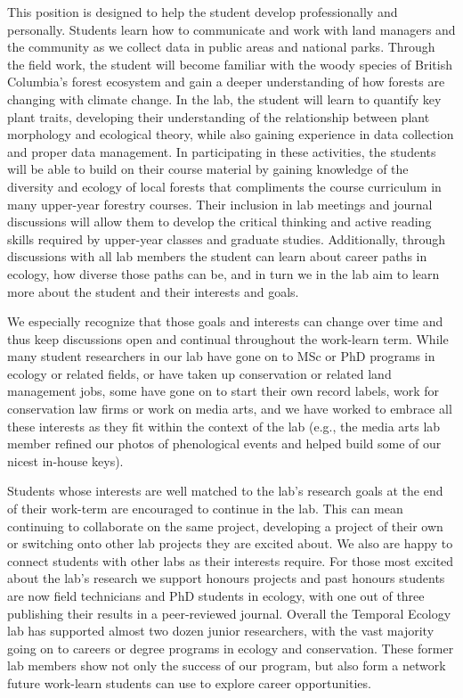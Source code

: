 \documentclass[11pt, oneside]{article}   	%
\begin{document}
This position is designed to help the student develop professionally and personally. Students learn how to communicate and work with land managers and the community as we collect data in public areas and national parks. Through the field work, the student will become familiar with the woody species of British Columbia's forest ecosystem and gain a deeper understanding of how forests are changing with climate change. In the lab, the student will learn to quantify key plant traits, developing their understanding of the relationship between plant morphology and ecological theory, while also gaining experience in data collection and proper data management. In participating in these activities, the students will be able to build on their course material by gaining knowledge of the diversity and ecology of local forests that compliments the course curriculum in many upper-year forestry courses. Their inclusion in lab meetings and journal discussions will allow them to develop the critical thinking and active reading skills required by upper-year classes and graduate studies. Additionally, through discussions with all lab members the student can learn about career paths in ecology, how diverse those paths can be, and in turn we in the lab aim to learn more about the student and their interests and goals. 

We especially recognize that those goals and interests can change over time and thus keep discussions open and continual throughout the work-learn term. While many student researchers in our lab have gone on to MSc or PhD programs in ecology or related fields, or have taken up conservation or related land management jobs, some have gone on to start their own record labels, work for conservation law firms or work on media arts, and we have worked to embrace all these interests as they fit within the context of the lab (e.g., the media arts lab member refined our photos of phenological events and helped build some of our nicest in-house keys). 

Students whose interests are well matched to the lab's research goals at the end of their work-term are encouraged to continue in the lab. This can mean continuing to collaborate on the same project, developing a project of their own or switching onto other lab projects they are excited about. We also are happy to connect students with other labs as their interests require. For those most excited about the lab's research we support honours projects and past honours students are now field technicians and PhD students in ecology, with one out of three publishing their results in a peer-reviewed journal. Overall the Temporal Ecology lab has supported almost two dozen junior researchers, with the vast majority going on to careers or degree programs in ecology and conservation. These former lab members show not only the success of our program, but also form a network future work-learn students can use to explore career opportunities. 
\end{document}

